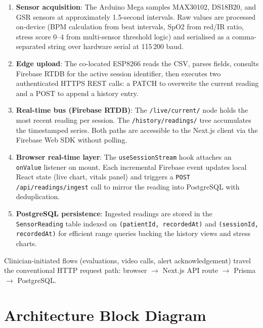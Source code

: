 \documentclass[12pt,a4paper]{report}
\begin{document}
\begin{enumerate}[leftmargin=1.5em, itemsep=0.3em]
  \item \textbf{Sensor acquisition}: The Arduino Mega samples MAX30102,
        DS18B20, and GSR sensors at approximately 1.5-second intervals.
        Raw values are processed on-device (BPM calculation from beat
        intervals, SpO2 from red/IR ratio, stress score 0--4 from
        multi-sensor threshold logic) and serialised as a comma-separated
        string over hardware serial at 115\,200 baud.

  \item \textbf{Edge upload}: The co-located ESP8266 reads the CSV,
        parses fields, consults Firebase RTDB for the active session
        identifier, then executes two authenticated HTTPS REST calls:
        a PATCH to overwrite the current reading and a POST to append
        a history entry.

  \item \textbf{Real-time bus (Firebase RTDB)}: The \texttt{/live/current/}
        node holds the most recent reading per session. The
        \texttt{/history/readings/} tree accumulates the timestamped
        series. Both paths are accessible to the Next.js client via
        the Firebase Web SDK without polling.

  \item \textbf{Browser real-time layer}: The \texttt{useSessionStream}
        hook attaches an \texttt{onValue} listener on mount. Each
        incremental Firebase event updates local React state (live
        chart, vitals panel) and triggers a \texttt{POST /api/readings/ingest}
        call to mirror the reading into PostgreSQL with deduplication.

  \item \textbf{PostgreSQL persistence}: Ingested readings are stored
        in the \texttt{SensorReading} table indexed on
        \texttt{(patientId, recordedAt)} and
        \texttt{(sessionId, recordedAt)} for efficient range queries
        backing the history views and stress charts.
\end{enumerate}

Clinician-initiated flows (evaluations, video calls, alert acknowledgement)
travel the conventional HTTP request path: browser $\to$ Next.js API
route $\to$ Prisma $\to$ PostgreSQL.

\section{Architecture Block Diagram}
\end{document}

